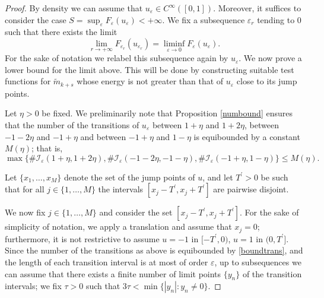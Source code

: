 \documentclass{article}
\newcommand{\e}{\varepsilon}
\begin{document}
\begin{proof}
By density we can assume that $u_\e\in C^\infty([0,1])$. Moreover, it suffices to consider the case  $S=\sup_\e F_\e(u_\e)<+\infty$.  We fix a subsequence $\e_r$ tending to $0$ such that there exists the limit $$\lim_{r\to+\infty} F_{\e_r}(u_{\e_r})=
\liminf_{\e\to 0} F_{\e}(u_{\e}).
$$
For the sake of notation we relabel this subsequence again by $u_\e$.
We now prove a lower bound for the limit above. This will be done by constructing suitable test functions for $\widetilde m_{k+s}$ whose energy is not greater than that of $u_\e$ close to its jump points. 

Let $\eta>0$ be fixed. We preliminarily note that Proposition \ref{numbound} ensures that the number of the transitions of $u_\e$ between $1+\eta$ and $1+2\eta$, between $-1-2\eta$ and $-1+\eta$ and between $-1+\eta$ and $1-\eta$ is equibounded by a constant $M(\eta)$; that is, 
\begin{equation}\label{boundtrans} 
\max\big\{\#\mathcal I_\e(1+\eta, 1+2\eta), \#\mathcal I_\e(-1-2\eta, -1-\eta), \#\mathcal I_\e(-1+\eta, 1-\eta)\big\}\leq M(\eta).
\end{equation}  

Let 
$\{x_1,\dots, x_M\}$ denote the set of the jump points of $u$, and let  
$T^\prime>0$ be such that for all $j\in\{1,\dots, M\}$ the intervals $[x_j-T^\prime,x_j+T^\prime]$ are pairwise disjoint.  

We now fix $j\in\{1,\dots, M\}$ and consider the set $[x_j-T^\prime,x_j+T^\prime]$. For the sake of simplicity of notation, we apply a translation and assume that $x_j=0$; furthermore,  it is not restrictive to assume $u=-1$ in $[-T^\prime,0)$, $u=1$ in $(0,T^\prime]$. 
Since the number of the transitions as above is equibounded by \eqref{boundtrans}, and the length of each transition interval is at most of order $\e$, up to subsequences we can assume that there exists a finite number of limit points $\{y_n\}$ of the transition intervals; we fix $\tau>0$ such that $3\tau<\min\{|y_n|: y_n\neq 0\}$. 


\end{proof}
\end{document}
